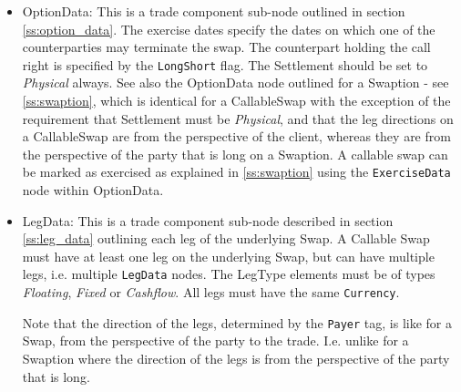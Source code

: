 \begin{itemize}

\item OptionData: This is a trade component sub-node outlined in section \ref{ss:option_data}. The exercise dates
  specify the dates on which one of the counterparties may terminate the swap. The counterpart holding the call right is
  specified by the {\tt LongShort} flag. The Settlement should be set to \emph{Physical} always. See also the OptionData
  node outlined for a Swaption - see \ref{ss:swaption}, which is identical for a CallableSwap with the exception of the
  requirement that Settlement must be \emph{Physical}, and that the leg directions on a CallableSwap are from the perspective of the client, whereas they are from the perspective of the party that is long on a Swaption. A callable swap can be marked as exercised as explained in
  \ref{ss:swaption} using the \lstinline!ExerciseData! node within OptionData.

\item LegData: This is a trade component sub-node described in section \ref{ss:leg_data} outlining each leg of the
  underlying Swap. A Callable Swap must have at least one leg on the underlying Swap, but can have multiple legs,
  i.e. multiple \lstinline!LegData! nodes.  The LegType elements must be of types \emph{Floating}, \emph{Fixed} or
  \emph{Cashflow}. All legs must have the same \lstinline!Currency!.
  
  Note that the direction of the legs, determined by the \lstinline!Payer! tag, is like for a Swap, from the perspective of the party to the trade. I.e. unlike for a Swaption where the direction of the legs is from the perspective of the party that is long. 

\end{itemize}
